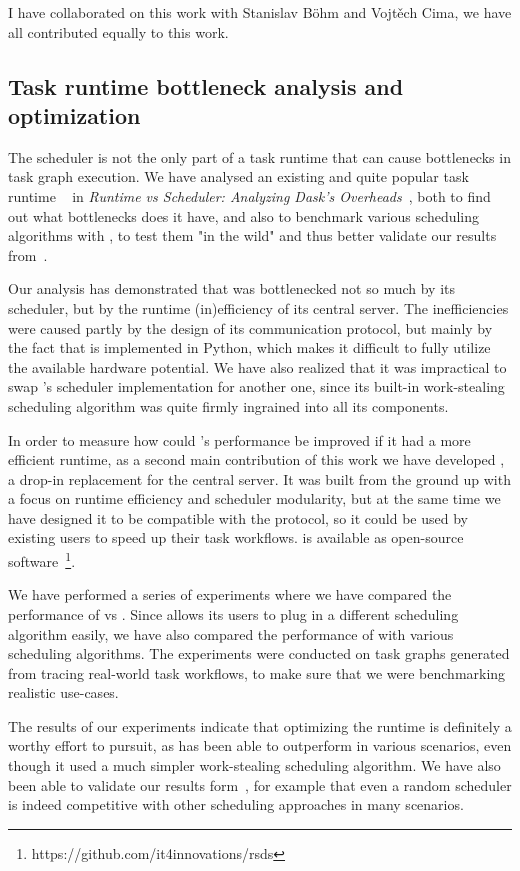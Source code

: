I have collaborated on this work with Stanislav Böhm and Vojtěch Cima, we have all contributed
equally to this work.

\subsection{Task runtime bottleneck analysis and optimization}
The scheduler is not the only part of a task runtime that can cause bottlenecks in task graph
execution. We have analysed an existing and quite popular task runtime \dask{}~\cite{dask} in
\emph{Runtime vs Scheduler: Analyzing Dask's Overheads}~\cite{rsds}, both to find out what
bottlenecks does it have, and also to benchmark various scheduling algorithms with \dask{},
to test them "in the wild" and thus better validate our results from~\cite{estee}.

Our analysis has demonstrated that \dask{} was bottlenecked not so much by its scheduler, but
by the runtime (in)efficiency of its central server. The inefficiencies were caused partly by
the design of its communication protocol, but mainly by the fact that \dask{} is implemented in
Python, which makes it difficult to fully utilize the available hardware potential. We have
also realized that it was impractical to swap \dask{}'s scheduler implementation for another one,
since its built-in work-stealing scheduling algorithm was quite firmly ingrained into all its
components.

In order to measure how could \dask{}'s performance be improved if it had a more efficient runtime,
as a second main contribution of this work we have developed \rsds{}, a drop-in
replacement for the \dask{} central server. It was built from the ground up with a focus on
runtime efficiency and scheduler modularity, but at the same time we have designed it to be
compatible with the \dask{} protocol, so it could be used by existing \dask{} users to speed up
their task workflows. \rsds{} is available as open-source
software~\footnote{https://github.com/it4innovations/rsds}.

We have performed a series of experiments where we have compared the performance of \rsds{} vs
\dask{}. Since \rsds{} allows its users to plug in a different scheduling algorithm easily, we
have also compared the performance of \rsds{} with various scheduling algorithms. The experiments
were conducted on task graphs generated from tracing real-world \dask{} task workflows, to make
sure that we were benchmarking realistic use-cases.

The results of our experiments indicate that optimizing the runtime is definitely a worthy effort
to pursuit, as \rsds{} has been able to outperform \dask{} in various scenarios, even though it
used a much simpler work-stealing scheduling algorithm. We have also been able to validate our
results form~\cite{estee}, for example that even a random scheduler is indeed competitive with
other scheduling approaches in many scenarios.

